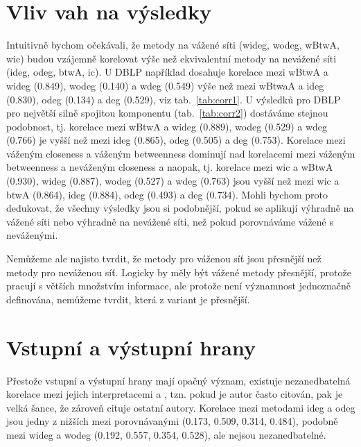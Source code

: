 \documentclass{bakalarka}
\begin{document}
\section{Vliv vah na výsledky}
Intuitivně bychom očekávali, že metody na vážené síti (wideg, wodeg, wBtwA,
wic) budou vzájemně korelovat výše než ekvivalentní metody na nevážené síti
(ideg, odeg, btwA, ic). U DBLP například dosahuje korelace mezi wBtwA a wideg
(0.849), wodeg (0.140) a wdeg (0.549) výše než mezi wBtwaA a ideg (0.830), odeg
(0.134) a deg (0.529), viz tab.~\ref{tab:corr1}. U výsledků pro DBLP pro
největší silně spojitou komponentu (tab.~\ref{tab:corr2}) dostáváme stejnou
podobnost, tj. korelace mezi wBtwA a wideg (0.889), wodeg (0.529) a wdeg
(0.766) je vyšší než mezi ideg (0.865), odeg (0.505) a deg (0.753).  Korelace
mezi váženým closeness a váženým betweenness dominují nad korelacemi mezi
váženým betweenness a neváženým closeness a naopak, tj. korelace mezi wic a
wBtwA (0.930), wideg (0.887), wodeg (0.527) a wdeg (0.763) jsou vyšší než mezi
wic a btwA (0.864), ideg (0.884), odeg (0.493) a deg (0.734).  Mohli bychom
proto dedukovat, že všechny výsledky jsou si podobnější, pokud se aplikují
výhradně na vážené síti nebo výhradně na nevážené síti, než pokud porovnáváme
vážené s neváženými.

Nemůžeme ale najisto tvrdit, že metody pro váženou síť jsou přesnější než
metody pro neváženou síť. Logicky by měly být vážené metody přesnější, protože
pracují s větších množstvím informace, ale protože není významnost jednoznačně
definována, nemůžeme tvrdit, která z variant je přesnější.

\section{Vstupní a výstupní hrany}


Přestože vstupní a výstupní hrany mají opačný význam, existuje nezanedbatelná
korelace mezi jejich interpretacemi  a , tzn. pokud
je autor často citován, pak je velká šance, že zároveň cituje ostatní autory.
Korelace mezi metodami ideg a odeg jsou jedny z nižších mezi porovnávanými
(0.173, 0.509, 0.314, 0.484), podobně mezi wideg a wodeg (0.192, 0.557, 0.354,
0.528), ale nejsou nezanedbatelné.
\end{document}
